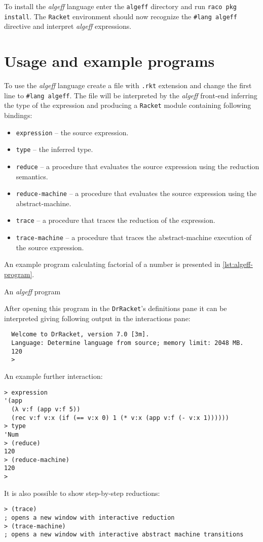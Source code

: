 \documentclass[inz, english, longabstract]{iithesis}
\newcommand{\Racket}{\texttt{Racket}}
\begin{document}
To install the \emph{algeff} language enter the \texttt{algeff} directory and run \texttt{raco pkg install}.
The \Racket{} environment should now recognize the \texttt{\#lang algeff} directive and interpret \emph{algeff} expressions.

\section{Usage and example programs}
To use the \emph{algeff} language create a file with \texttt{.rkt} extension and change the first line to \texttt{\#lang algeff}.
The file will be interpreted by the \emph{algeff} front-end inferring the type of the expression and producing a \Racket{} module containing following bindings:
\begin{itemize}
  \item \texttt{expression} -- the source expression.
  \item \texttt{type} -- the inferred type.
  \item \texttt{reduce} -- a procedure that evaluates the source expression using the reduction semantics.
  \item \texttt{reduce-machine} -- a procedure that evaluates the source expression using the abstract-machine.
  \item \texttt{trace} -- a procedure that traces the reduction of the expression.
  \item \texttt{trace-machine} -- a procedure that traces the abstract-machine execution of the source expression.
\end{itemize}

An example program calculating factorial of a number is presented in \autoref{lst:algeff-program}.
\begin{listing}[t]
  \caption{An \emph{algeff} program}
  \label{lst:algeff-program}
\end{listing}
After opening this program in the \texttt{DrRacket}'s definitions pane it can be interpreted giving following output in the interactions pane:
\begin{verbatim}
  Welcome to DrRacket, version 7.0 [3m].
  Language: Determine language from source; memory limit: 2048 MB.
  120
  >
\end{verbatim}
An example further interaction:
\begin{verbatim}
> expression
'(app
  (λ v:f (app v:f 5))
  (rec v:f v:x (if (== v:x 0) 1 (* v:x (app v:f (- v:x 1))))))
> type
'Num
> (reduce)
120
> (reduce-machine)
120
>
\end{verbatim} 
It is also possible to show step-by-step reductions:
\begin{verbatim}
> (trace)
; opens a new window with interactive reduction
> (trace-machine)
; opens a new window with interactive abstract machine transitions
\end{verbatim}
\end{document}
